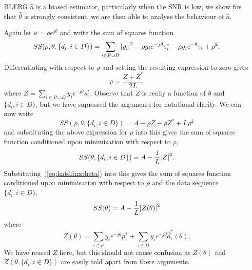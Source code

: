 \documentclass[journal]{IEEEtran}
\begin{document}
BLERG $\hat{a}$ is a biased estimator, particularly when the SNR is low, we show firs that $\hat{\theta}$ is strongly consistent, we are then able to analyse the behaviour of $\hat{a}$.

Again let $a = \rho e^{j\theta}$ and write the sum of squares function  
\[
SS(\rho, \theta, \{d_i, i \in D\}) = \sum_{i \in P \cup D} {\left| y_i \right|}^2 - \rho y_i e^{-j\theta} s_i^* - \rho y_i e^{-\theta} s_i + \rho^2.
\]
Differentiating with respect to $\rho$ and setting the resulting expression to zero gives 
\[
\rho = \frac{Z + Z^*}{2L}
\]
where $Z = \sum_{i\in P \cup D}y_i e^{-j\theta} s_i^*$.  Observe that $Z$ is really a function of $\theta$ and $\{d_i, i \in D\}$, but we have supressed the arguments for notational clarity.  We can now write
\[
SS(\rho, \theta, \{d_i, i \in D\}) = A - \rho Z - \rho Z^* + L \rho^2
\]
and substituting the above expression for $\rho$ into this gives the sum of squares function conditioned upon minimisation with respect to $\rho$,
\[
SS(\theta, \{d_i, i \in D\}) = A - \frac{1}{L}{\left| Z \right|}^2.
\]
Substituting~(\ref{eq:hatdfinxtheta}) into this gives the sum of squares function conditioned upon minimisation with respect to $\rho$ and the data sequence $\{d_i, i \in D\}$,
\[
SS(\theta) = A - \frac{1}{L}{\left| Z(\theta) \right|}^2
\]
where
\[
Z(\theta)  = \sum_{i \in P} y_i e^{-j\theta} p_i^* + \sum_{i \in D} y_i e^{-j\theta} \hat{d}_i^*(\theta).
\]
We have reused $Z$ here, but this should not cause confusion as $Z(\theta)$ and $Z(\theta, \{d_i, i \in D\})$ are easily told apart from there arguments.  %
\end{document}
